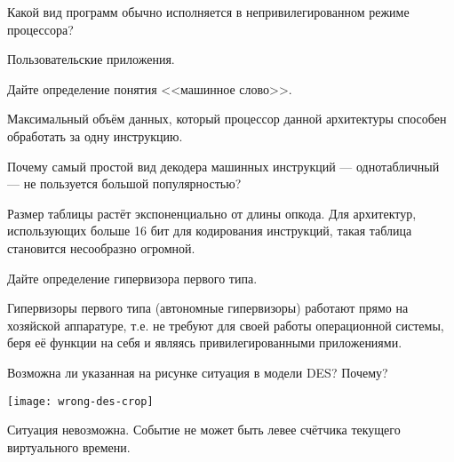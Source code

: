 \documentclass[a4paper, addpoints]{exam}
\begin{document}
\begin{questions}

\question[3] Какой вид программ обычно исполняется в непривилегированном режиме процессора?
\begin{solution}[1cm]
Пользовательские приложения.
\end{solution}

\question[3] Дайте определение понятия <<машинное слово>>.
\begin{solution}[1cm]
Максимальный объём данных, который процессор данной архитектуры способен обработать за одну инструкцию. 
\end{solution}

\question[3] Почему самый простой вид декодера машинных инструкций --- однотабличный --- не пользуется большой популярностью?
\begin{solution}[1cm]
    Размер таблицы растёт экспоненциально от длины опкода. Для архитектур, использующих больше 16 бит для кодирования инструкций, такая таблица становится несообразно огромной.
\end{solution}

\question[3] Дайте определение гипервизора первого типа.
\begin{solution}[2cm]
Гипервизоры первого типа (автономные гипервизоры) работают прямо на хозяйской аппаратуре, т.е. не требуют для своей работы операционной системы, беря её функции на себя и являясь привилегированными приложениями.
\end{solution}


\question[3] Возможна ли указанная на рисунке ситуация в модели DES? Почему?
\begin{center}
\texttt{[image: wrong-des-crop]}
\end{center}
\begin{solution}[1cm]
Ситуация невозможна. Событие не может быть левее счётчика текущего виртуального времени.
\end{solution}


\end{questions}
\end{document}

